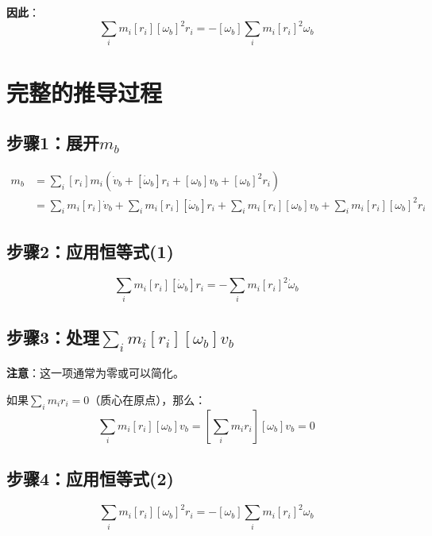 \documentclass[12pt,a4paper]{article}
\begin{document}
\textbf{因此}：
\begin{equation}
\sum_i m_i [r_i][\omega_b]^2 r_i = -[\omega_b] \sum_i m_i [r_i]^2 \omega_b
\end{equation}

\section{完整的推导过程}

\subsection{步骤1：展开$m_b$}

\begin{align}
m_b &= \sum_i [r_i] m_i (\dot{v}_b + [\dot{\omega}_b] r_i + [\omega_b] v_b + [\omega_b]^2 r_i) \\
&= \sum_i m_i [r_i] \dot{v}_b + \sum_i m_i [r_i][\dot{\omega}_b] r_i + \sum_i m_i [r_i][\omega_b] v_b + \sum_i m_i [r_i][\omega_b]^2 r_i
\end{align}

\subsection{步骤2：应用恒等式(1)}

\begin{equation}
\sum_i m_i [r_i][\dot{\omega}_b] r_i = -\sum_i m_i [r_i]^2 \dot{\omega}_b
\end{equation}

\subsection{步骤3：处理$\sum_i m_i [r_i][\omega_b] v_b$}

\textbf{注意}：这一项通常为零或可以简化。

如果$\sum_i m_i r_i = 0$（质心在原点），那么：
\begin{equation}
\sum_i m_i [r_i][\omega_b] v_b = [\sum_i m_i r_i][\omega_b] v_b = 0
\end{equation}

\subsection{步骤4：应用恒等式(2)}

\begin{equation}
\sum_i m_i [r_i][\omega_b]^2 r_i = -[\omega_b] \sum_i m_i [r_i]^2 \omega_b
\end{equation}
\end{document}
